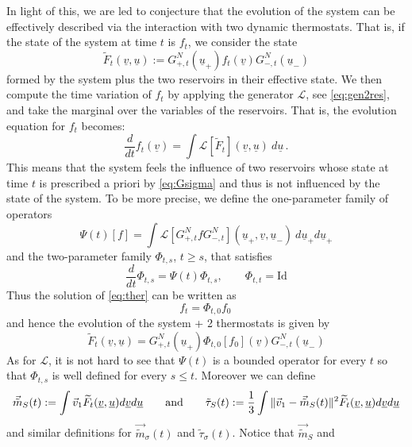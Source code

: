 \documentclass{article}
\newcommand*\cL{ \mathcal{L} }
\newcommand\uv{{\underline v}}
\newcommand\uu{{\underline u}}
\begin{document}
In light of this, we are led to conjecture that the evolution of the system can be effectively described via the
interaction with two dynamic thermostats. That is, if the state of the system at time $t$ is $f_t$, we consider the
state
\[
\widetilde F_t( \uv, \uu) := G_{+,t}^N(\uu_+)f_t(\uv)G_{-,t}^N(\uu_-)
\]
formed by the system plus the two reservoirs in their effective state. We then compute the time variation of $f_t$ by 
applying the generator $\cL$, see \eqref{eq:gen2res}, and take the marginal over the variables of the reservoirs. 
That is, the evolution equation for $f_t$ becomes:
%
\begin{equation}\label{eq:ther}
\frac{d}{dt} f_t(\uv) = \int \mathcal L [\widetilde F_t](\uv, \uu) \ d\uu\, .
\end{equation}
%
This means that the system feels the influence of two reservoirs whose state at time $t$ is prescribed a priori by 
\eqref{eq:Gsigma} and thus is not influenced by the state of the system. To be more precise, we define the 
one-parameter family of 
operators
%
\begin{equation*}
\Psi(t)[f]  = \int \mathcal L[G_{+,t}^N f G_{-,t}^N] (\uu_+, \uv, \uu_-) \ d\uu_+ d\uu_+
\end{equation*}
%
and the two-parameter family $\Phi_{t,s}$, $t \geq s$, that satisfies
\begin{equation}\label{eq:2times}
\frac{d}{dt} \Phi_{t,s} = \Psi(t) \Phi_{t,s},\qquad\Phi_{t,t}=\mathrm{Id}
\end{equation}
Thus the solution of \eqref{eq:ther} can be written as
\begin{equation}\label{eq:evolther}
f_t=\Phi_{t,0}f_0\, 
\end{equation}
and hence the evolution of the system + 2 thermostats is given by
\begin{equation*}
\widetilde F_t(\underline v, \underline u) = G_{+,t}^N(\underline u_+)\Phi_{t,0} [f_0](\underline v)G_{-,t}^N(\underline u_-)
\end{equation*}
As for $\cL$, it is not hard to see that $\Psi(t)$ is a bounded operator for every $t$ so that $\Phi_{t,s}$ is well 
defined for every $s\leq t$. Moreover we can define
\begin{equation}\label{eq:tildem}
\vec{\tilde m}_S(t):=\int \vec v_{1}  \widetilde F_t(\uv,\uu) d\uv d\uu\qquad\hbox{and}\qquad
\tilde\tau_S(t):=\frac13\int \|\vec v_{1}-\vec {\tilde m}_S(t)\|^2 \widetilde F_t(\uv,\uu) d\uv d\uu
\end{equation}
and similar definitions for $\vec{\tilde m}_\sigma(t)$ and $\tilde \tau_\sigma(t)$. Notice that $\vec{\tilde m}_S$ and
\end{document}

